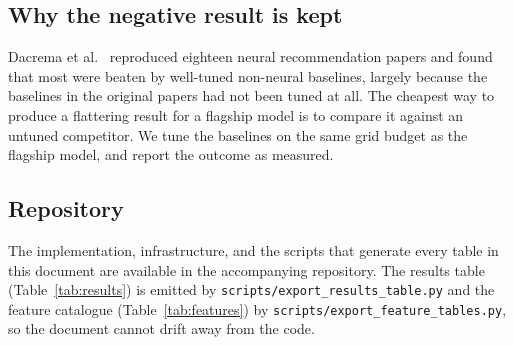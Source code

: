 \subsection{Why the negative result is kept}

Dacrema et al.~\cite{dacrema2019} reproduced eighteen neural recommendation
papers and found that most were beaten by well-tuned non-neural baselines,
largely because the baselines in the original papers had not been tuned at
all. The cheapest way to produce a flattering result for a flagship model is
to compare it against an untuned competitor. We tune the baselines on the same
grid budget as the flagship model, and report the outcome as measured.

\subsection{Repository}

The implementation, infrastructure, and the scripts that generate every table
in this document are available in the accompanying repository. The results
table (Table~\ref{tab:results}) is emitted by
\texttt{scripts/export\_results\_table.py} and the feature catalogue
(Table~\ref{tab:features}) by \texttt{scripts/export\_feature\_tables.py},
so the document cannot drift away from the code.

